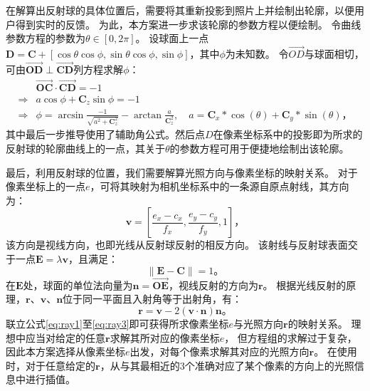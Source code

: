 在解算出反射球的具体位置后，需要将其重新投影到照片上并绘制出轮廓，以便用户得到实时的反馈。
为此，本方案进一步求该轮廓的参数方程以便绘制。
令曲线参数方程的参数为$\theta\in[0, 2\pi]$。
设球面上一点$\mathbf{D} = \mathbf{C} + [\cos\theta \cos\phi, \sin\theta \cos\phi, \sin\phi]$，其中$\phi$为未知数。
令$\overrightarrow{OD}$与球面相切，可由$\overrightarrow{\mathbf{O}\mathbf{D}} \perp \overrightarrow{\mathbf{C}\mathbf{D}}$列方程求解$\phi$：
\begin{equation}
\begin{aligned}
&\overrightarrow{\mathbf{O}\mathbf{C}} \cdot \overrightarrow{\mathbf{C}\mathbf{D}} = -1 \\
\Rightarrow &a \cos\phi + \mathbf{C}_z \sin\phi = -1\\
\Rightarrow &\phi = \arcsin\frac{-1}{\sqrt{a^2 + \mathbf{C}_z^2}} - \arctan\frac{a}{\mathbf{C}_z^2}, \quad a = \mathbf{C}_x * \cos(\theta) + \mathbf{C}_y * \sin(\theta)
\text{，}
\end{aligned}
\end{equation}
其中最后一步推导使用了辅助角公式。然后点$D$在像素坐标系中的投影即为所求的反射球的轮廓曲线上的一点，其关于$\theta$的参数方程可用于便捷地绘制出该轮廓。

最后，利用反射球的位置，我们需要解算光照方向与像素坐标的映射关系。
对于像素坐标上的一点$e$，可将其映射为相机坐标系中的一条源自原点射线，其方向为：
\begin{equation}
    \mathbf{v} = \left[\frac{e_x-c_x}{f_x}, \frac{e_y-c_y}{f_y}, 1\right]
    \text{，}
    \label{eq:ray1}
\end{equation}
该方向是视线方向，也即光线从反射球反射的相反方向。
该射线与反射球表面交于一点$\mathbf{E}=\lambda\mathbf{v}$，且满足：
\begin{equation}
    \| \mathbf{E} - \mathbf{C} \| = 1
    \text{。}
    \label{eq:ray2}
\end{equation}
在$\mathbf{E}$处，球面的单位法向量为$\mathbf{n}=\overrightarrow{\mathbf{O}\mathbf{E}}$，视线反射的方向为$\mathbf{r}$。
根据光线反射的原理，$\mathbf{r}$、$\mathbf{v}$、$\mathbf{n}$位于同一平面且入射角等于出射角，有：
\begin{equation}
    \mathbf{r} = \mathbf{v} - 2(\mathbf{v} \cdot \mathbf{n}) \mathbf{n}
    \text{。}
    \label{eq:ray3}
\end{equation}
联立公式\eqref{eq:ray1}至\eqref{eq:ray3}即可获得所求像素坐标$e$与光照方向$\mathbf{r}$的映射关系。
理想中应当对给定的任意$\mathbf{r}$求解其所对应的像素坐标$e$，
但方程组的求解过于复杂，因此本方案选择从像素坐标$e$出发，对每个像素求解其对应的光照方向$\mathbf{r}$。
在使用时，对于任意给定的$\mathbf{r}$，从与其最相近的3个准确对应了某个像素的方向上的光照信息中进行插值。

